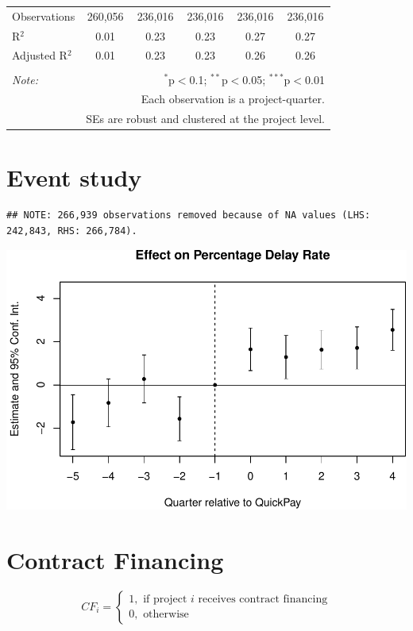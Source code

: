 \documentclass[
]{article}
\begin{document}
\begin{table}[H]
\begin{tabular}{@{\extracolsep{-2pt}}lccccc}
Observations & 260,056 & 236,016 & 236,016 & 236,016 & 236,016 \\ 
R$^{2}$ & 0.01 & 0.23 & 0.23 & 0.27 & 0.27 \\ 
Adjusted R$^{2}$ & 0.01 & 0.23 & 0.23 & 0.26 & 0.26 \\ 
\hline 
\hline \\[-1.8ex] 
\textit{Note:}  & \multicolumn{5}{r}{$^{*}$p$<$0.1; $^{**}$p$<$0.05; $^{***}$p$<$0.01} \\ 
 & \multicolumn{5}{r}{Each observation is a project-quarter.} \\ 
 & \multicolumn{5}{r}{SEs are robust and clustered at the project level.} \\ 
\end{tabular} 
\end{table}

\hypertarget{event-study}{%
\section{Event study}\label{event-study}}

\begin{verbatim}
## NOTE: 266,939 observations removed because of NA values (LHS: 242,843, RHS: 266,784).
\end{verbatim}

\includegraphics{qp_first_pc_delay-2_files/figure-latex/event_study-1.pdf}

\hypertarget{contract-financing}{%
\section{Contract Financing}\label{contract-financing}}

\[ CF_i = \begin{cases} 1, \text{ if project } i \text{ receives contract financing}\\
0, \text{ otherwise} \end{cases}\]
\end{document}
